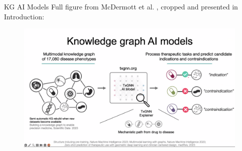 \documentclass{beamer}
\begin{document}
\begin{frame}{KG AI Models}
    Full figure from McDermott et al. \cite{mcdermott_structure-inducing_2023}, cropped and presented in Introduction:
    \begin{figure}
        \centering
        \includegraphics[scale=0.13]{Junwei_KG_Models_Infograph.png}
    \end{figure}
\end{frame}
\end{document}
